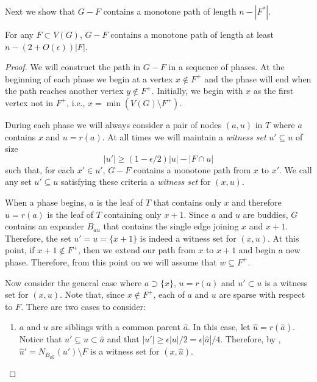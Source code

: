 \documentclass{patmorin}
\begin{document}
Next we show that $G-F$ contains a monotone path of length $n-|F^*|$.

\begin{clm}
  For any $F\subset V(G)$, $G-F$ contains a monotone path of length
  at least $n - (2+O(\epsilon))|F|$.
\end{clm}

\begin{proof}
  We will construct the path in $G-F$ in a sequence of phases. At
  the beginning of each phase we begin at a vertex $x\not\in F^+$
  and the phase will end when the path reaches another vertex
  $y\not\in F^+$.  Initially, we begin with $x$ as the first vertex
  not in $F^+$, i.e., $x=\min(V(G)\setminus F^+)$.

  During each phase we will always consider a pair of nodes $(a,u)$
  in $T$ where $a$ contains $x$ and $u=r(a)$.  At all times we will
  maintain a \emph{witness set} $u'\subseteq u$ of size
  \[
     |u'| \ge (1-\epsilon/2)|u|-|F\cap u|
  \]
  such that, for each $x'\in u'$, $G-F$ contains a monotone path from $x$
  to $x'$.  We call any set $u'\subseteq u$ satisfying these criteria a
  \emph{witness set} for $(x,u)$.

  When a phase begins, $a$ is the leaf of $T$ that contains only $x$ and
  therefore $u=r(a)$ is the leaf of $T$ containing only $x+1$.  Since $a$
  and $u$ are buddies, $G$ contains an expander $B_{au}$ that contains the
  single edge joining $x$ and $x+1$.  Therefore, the set $u'=u=\{x+1\}$
  is indeed a witness set for $(x,u)$.  
  At this point, if $x+1\not\in
  F^+$, then we extend our path from $x$ to $x+1$ and begin a new phase.
  Therefore, from this point on we will assume that $w\subseteq F^+$.

  Now consider the general case where $a\supset\{x\}$, $u=r(a)$ and
  $u'\subset u$ is a witness set for $(x,u)$.  Note that, since $x\not\in
  F^+$, each of $a$ and $u$ are sparse with respect to $F$. There are two cases to consider:
  \begin{enumerate}
    \item $a$ and $u$ are siblings with a common parent $\hat{a}$.  In this case, let $\hat{u}=r(\hat{a})$.  Notice that $u'\subseteq u\subset\hat{a}$ and that $|u'|\ge \epsilon|u|/2 = \epsilon|\hat{a}|/4$.  
	    Therefore, by , $\hat{u}'= N_{B_{\hat{a}\hat{u}}}(u')\setminus F$ is a witness set for $(x,\hat{u})$.


\end{enumerate}
\end{proof}
\end{document}
